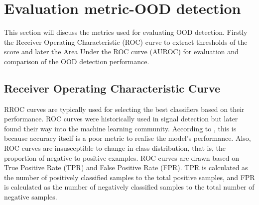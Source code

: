 \section{Evaluation metric-OOD detection}
This section will discuss the metrics used for evaluating OOD detection. Firstly the Receiver Operating Characteristic (ROC) curve to extract thresholds of the score and later the Area Under the ROC curve (AUROC) for evaluation and comparison of the OOD detection performance.
\subsection{Receiver Operating Characteristic Curve}
RROC curves are typically used for selecting the best classifiers based on their performance.
ROC curves were historically used in signal detection but later found their way into the machine learning community.
According to \cite{ROC_example}, this is because accuracy itself is a poor metric to realise the model's performance.
Also, ROC curves are insusceptible to change in class distribution, that is, the proportion of negative to positive examples.
ROC curves are drawn based on True Positive Rate (TPR) and False Positive Rate (FPR).
TPR is calculated as the number of positively classified samples to the total positive samples, and FPR is calculated as the number of negatively classified samples to the total number of negative samples.

